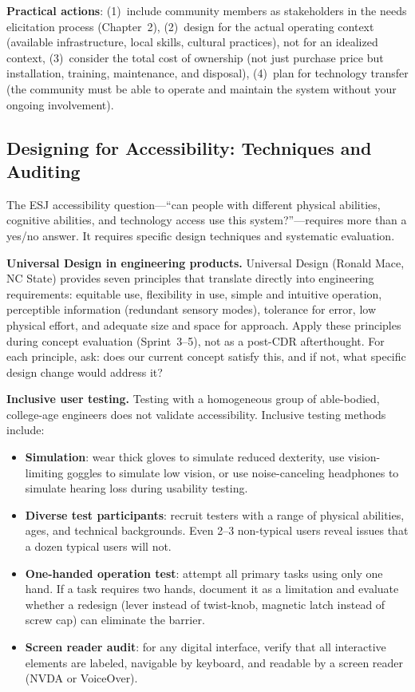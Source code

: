 \textbf{Practical actions}: (1)~include community members as stakeholders in the needs elicitation process (Chapter~2), (2)~design for the actual operating context (available infrastructure, local skills, cultural practices), not for an idealized context, (3)~consider the total cost of ownership (not just purchase price but installation, training, maintenance, and disposal), (4)~plan for technology transfer (the community must be able to operate and maintain the system without your ongoing involvement).

\subsection{Designing for Accessibility: Techniques and Auditing}
The ESJ accessibility question---``can people with different physical abilities, cognitive abilities, and technology access use this system?''---requires more than a yes/no answer. It requires specific design techniques and systematic evaluation.

\textbf{Universal Design in engineering products.} Universal Design (Ronald Mace, NC State) provides seven principles that translate directly into engineering requirements: equitable use, flexibility in use, simple and intuitive operation, perceptible information (redundant sensory modes), tolerance for error, low physical effort, and adequate size and space for approach. Apply these principles during concept evaluation (Sprint~3--5), not as a post-CDR afterthought. For each principle, ask: does our current concept satisfy this, and if not, what specific design change would address it?

\textbf{Inclusive user testing.} Testing with a homogeneous group of able-bodied, college-age engineers does not validate accessibility. Inclusive testing methods include:
\begin{itemize}[nosep,leftmargin=1.5em]
\item \textbf{Simulation}: wear thick gloves to simulate reduced dexterity, use vision-limiting goggles to simulate low vision, or use noise-canceling headphones to simulate hearing loss during usability testing.
\item \textbf{Diverse test participants}: recruit testers with a range of physical abilities, ages, and technical backgrounds. Even 2--3 non-typical users reveal issues that a dozen typical users will not.
\item \textbf{One-handed operation test}: attempt all primary tasks using only one hand. If a task requires two hands, document it as a limitation and evaluate whether a redesign (lever instead of twist-knob, magnetic latch instead of screw cap) can eliminate the barrier.
\item \textbf{Screen reader audit}: for any digital interface, verify that all interactive elements are labeled, navigable by keyboard, and readable by a screen reader (NVDA or VoiceOver).
\end{itemize}

